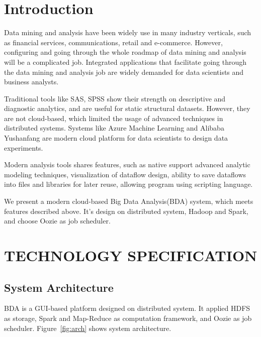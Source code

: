 \documentclass{sig-alternate-05-2015}
\begin{document}


%
%

%
%
\printccsdesc



\section{Introduction}
Data mining and analysis have been widely use in many industry verticals, such as financial services, communications, retail and e-commerce. However, configuring and going through the whole roadmap of data mining and analysis will be a complicated job. Integrated applications that facilitate going through the data mining and analysis job are widely demanded for data scientists and business analysts. 

Traditional tools like SAS, SPSS show their strength on descriptive and diagnostic analytics, and are useful for static structural datasets. However, they are not cloud-based, which limited the usage of advanced techniques in distributed systems. Systems like Azure Machine Learning and Alibaba Yushanfang are modern cloud platform for data scientists to design data experiments.

Modern analysis tools shares features, such as native support advanced analytic modeling techniques, visualization of dataflow design, ability to save dataflows into files and libraries for later reuse, allowing program using scripting language.

We present a modern cloud-based Big Data Analysis(BDA) system, which meets features described above. It's design on distributed system, Hadoop and Spark, and choose Oozie as job scheduler. 

\section{TECHNOLOGY SPECIFICATION}
\subsection{System Architecture}
BDA is a GUI-based platform designed on distributed system. It applied HDFS as storage, Spark and Map-Reduce as computation framework, and Oozie as job scheduler. Figure~\ref{fig:arch} shows system architecture.
\end{document}
